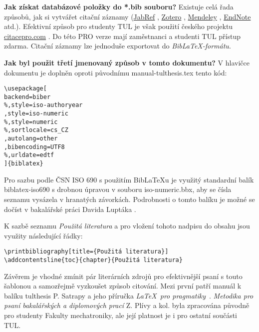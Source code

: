 \documentclass[FM,BP]{tulthesis}
\newcommand{\argument}[1]{{\ttfamily\color{\tulcolor}#1}}
\newenvironment{myquote}{\begin{list}{}{\setlength\leftmargin\parindent}\item[]}{\end{list}}
\newenvironment{listing}{\begin{myquote}\color{\tulcolor}}{\end{myquote}}
\begin{document}
\textbf{Jak získat databázové položky do \argument{*.bib} souboru?} Existuje celá řada způsobů, jak si vytvářet citační záznamy (\href{www.jabref.org}{JabRef} \cite{webJabRef}, \href{https://www.zotero.org}{Zotero} \cite{webZotero}, \href{https://www.mendeley.com}{Mendeley} \cite{webMendeley}, \href{https://endnote.com}{EndNote} \cite{webEndNote} atd.). Efektivní způsob pro studenty TUL je však použití českého projektu \href{citacepro.com}{citacepro.com} \cite{webCitaceCOM}. Do této PRO verze mají zaměstnanci a studenti TUL přístup zdarma. Citační záznamy lze jednoduše exportovat do \textit{Bib\LaTeX-formátu}. 

\textbf{Jak byl použit třetí jmenovaný způsob v tomto dokumentu?}
V hlavičce dokumentu je doplněn oproti původnímu \argument{manual-tulthesis.tex} tento kód:
\begin{listing}
\begin{verbatim}
\usepackage[ 
backend=biber
%,style=iso-authoryear
,style=iso-numeric
%,style=numeric
%,sortlocale=cs_CZ
,autolang=other
,bibencoding=UTF8
%,urldate=edtf
]{biblatex}

\end{verbatim}
\end{listing}
Pro sazbu podle ČSN ISO 690 s použitím Bib\LaTeX{}u je využitý standardní balík \argument{biblatex-iso690} s drobnou úpravou v souboru \argument{iso-numeric.bbx}, aby se čísla seznamu vysázela v hranatých závorkách. Podrobnosti o tomto balíku je možné se dočíst v bakalářské práci Davida Luptáka \cite{Lupták2016thesis}.

K sazbě seznamu \textit{Použitá literatura} a pro vložení tohoto nadpisu do obsahu jsou využity následující řádky:
\begin{listing}
\begin{verbatim}
\printbibliography[title={Použitá literatura}] 
\addcontentsline{toc}{chapter}{Použitá literatura}     
\end{verbatim}
\end{listing}

Závěrem je vhodné zmínit pár literárních zdrojů pro efektivnější psaní s touto šablonou a samozřejmě vyzkoušet způsob citování. Mezi první patří manuál k balíku \argument{tulthesis} P. Satrapy \cite{Satrapa2020tulthesis} a jeho příručka \textit{\LaTeX\  pro pragmatiky}~\cite{Satrapa2011LatexPragmatiky}. \textit{Metodika pro psaní bakalářských a diplomových prací} Z. Plívy a kol. \cite{Pliva2019DOKcz} byla zpracována původně pro studenty Fakulty mechatroniky, ale její platnost je i pro ostatní součásti TUL. 

\nocite{*}

\printbibliography[title={Použitá literatura}] %

\newpage
\renewcommand{\indexname}{Přehled příkazů, prostředí a voleb}
\printindex
\end{document}
